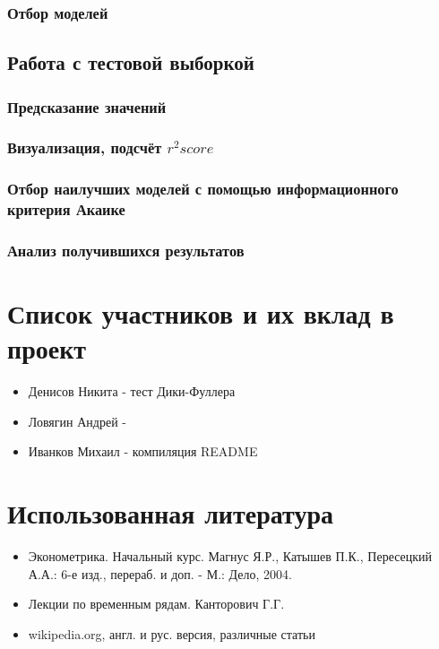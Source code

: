 \documentclass{article}
\begin{document}
    \subsubsection{Отбор моделей}
  
  \subsection{Работа с тестовой выборкой}
  
    \subsubsection{Предсказание значений}
    
    \subsubsection{Визуализация, подсчёт $r^2 score$}
    
    \subsubsection{Отбор наилучших моделей с помощью информационного критерия Акаике}
    
    \subsubsection{Анализ получившихся результатов}

\newpage
  

\section{Список участников и их вклад в проект}

\begin{itemize}
    \item Денисов Никита - тест Дики-Фуллера
    \item Ловягин Андрей -
    \item Иванков Михаил - компиляция README
\end{itemize}{}

\section{Использованная литература}

\begin{itemize}
    \item Эконометрика. Начальный курс.  Магнус Я.Р., Катышев П.К., Пересецкий А.А.: 6-е изд., перераб. и доп. - М.: Дело, 2004.
    \item Лекции по временным рядам. Канторович Г.Г.
    \item wikipedia.org, англ. и рус. версия, различные статьи
\end{itemize}
  
\end{document}
